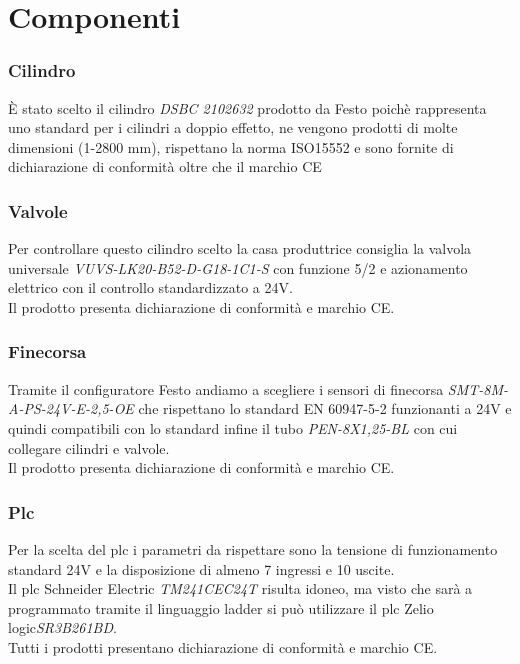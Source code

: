 \documentclass[12pt]{article}
\begin{document}
\section{Componenti}
\subsubsection{Cilindro}
È stato scelto il cilindro \textit{DSBC 2102632} prodotto da Festo poichè rappresenta uno standard per i cilindri a
doppio effetto, ne vengono prodotti di molte dimensioni (1-2800 mm), rispettano la norma ISO15552 e sono fornite di dichiarazione di conformità
oltre che il marchio CE \\
\subsubsection{Valvole}
Per controllare questo cilindro scelto la casa produttrice consiglia la valvola universale \textit{VUVS-LK20-B52-D-G18-1C1-S} con funzione 5/2 e azionamento elettrico
con il controllo standardizzato a 24V.\\
Il prodotto presenta dichiarazione di conformità e marchio CE.\\
\subsubsection{Finecorsa}
Tramite il configuratore Festo andiamo a scegliere i sensori di finecorsa \textit{SMT-8M-A-PS-24V-E-2,5-OE} che rispettano lo standard
EN 60947-5-2 funzionanti a 24V e quindi compatibili con lo standard infine il tubo \textit{PEN-8X1,25-BL} con cui collegare cilindri e
valvole.\\
Il prodotto presenta dichiarazione di conformità e marchio CE.\\
\subsubsection{Plc}
Per la scelta del plc i parametri da rispettare sono la tensione di funzionamento standard 24V e la disposizione di almeno 7 ingressi e
10 uscite.\\
Il plc Schneider Electric \textit{TM241CEC24T} risulta idoneo, ma visto che sarà a programmato tramite il
linguaggio ladder si può utilizzare il plc Zelio logic\textit{SR3B261BD}.\\
Tutti i prodotti presentano dichiarazione di conformità e marchio CE.\\
\end{document}

